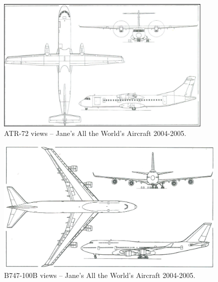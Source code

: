 \begin{figure}[H]
\centering
\includegraphics[height=6.4cm]{Immagini/ATR-72}
\caption{ATR-72 views – Jane’s All the World’s Aircraft 2004-2005.}
\label{atr}
\end{figure}
\begin{figure}[H]
\centering
\includegraphics[height=6.4cm]{Immagini/B747-100B}
\caption{B747-100B views – Jane’s All the World’s Aircraft 2004-2005.}
\label{boeing}
\end{figure}